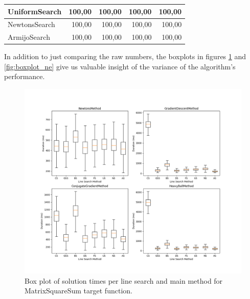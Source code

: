 \documentclass[a4paper,english,titlepage,12pt]{article}
\begin{document}
\begin{table}[]
\begin{tabular}{|l|r|r|r|r|}
    UniformSearch                                                             & 100,00                                                   & 100,00                                                    & 100,00                                                    & 100,00                                                    \\ \hline
    NewtonsSearch                                                             & 100,00                                                   & 100,00                                                    & 100,00                                                    & 100,00                                                    \\ \hline
    ArmijoSearch                                                              & 100,00                                                   & 100,00                                                    & 100,00                                                    & 100,00                                                    \\ \hline
    \end{tabular}
\end{table}

In addition to just comparing the raw numbers, the boxplots in figures \ref{fig:boxplot_mss} and \ref{fig:boxplot_ne} give us valuable insight of the variance of the algorithm's performance.

\begin{figure}[H]
	\centering
	\includegraphics[width=1.0\textwidth]{images/boxplot_mss.png}
	\caption{Box plot of solution times per line search and main method for MatrixSquareSum target function.}
	\label{fig:boxplot_mss}
\end{figure}
\end{document}
